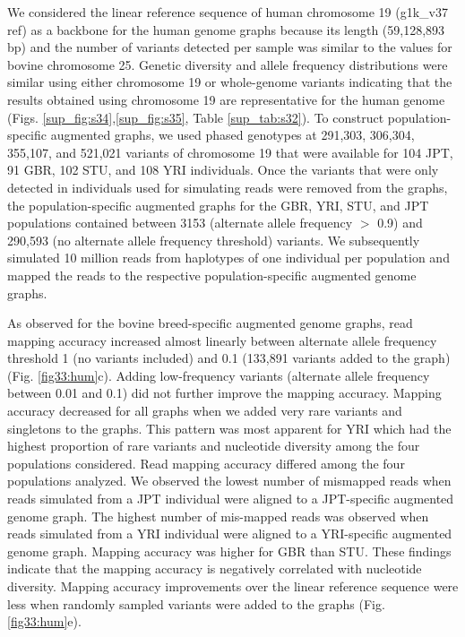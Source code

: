 \documentclass[../main.tex]{subfiles}
\begin{document}
We considered the linear reference sequence of human chromosome 19 (g1k\_v37 ref) as a backbone for the human genome graphs because its length (59,128,893 bp) and the number of variants detected per sample was similar to the values for bovine chromosome 25. Genetic diversity and allele frequency distributions were similar using either chromosome 19 or whole-genome variants indicating that the results obtained using chromosome 19 are representative for the human genome (Figs. \ref{sup_fig:s34},\ref{sup_fig:s35}, Table \ref{sup_tab:s32}). To construct population-specific augmented graphs, we used phased genotypes at 291,303, 306,304, 355,107, and 521,021 variants of chromosome 19 that were available for 104 JPT, 91 GBR, 102 STU, and 108 YRI individuals. Once the variants that were only detected in individuals used for simulating reads were removed from the graphs, the population-specific augmented graphs for the GBR, YRI, STU, and JPT populations contained between 3153 
(alternate allele frequency $>$ 0.9) and 290,593 (no alternate allele frequency threshold) variants. We subsequently simulated 10 million reads from haplotypes of one individual per population and mapped the reads to the respective population-specific augmented genome graphs.

As observed for the bovine breed-specific augmented genome graphs, read mapping accuracy increased almost linearly between alternate allele frequency threshold 1 (no variants included) and 0.1 (133,891 variants added to the graph) (Fig. \ref{fig33:hum}c). Adding low-frequency variants (alternate allele frequency between 0.01 and 0.1) did not further improve the mapping accuracy. Mapping accuracy decreased for all graphs when we added very rare variants and singletons to the graphs. This pattern was most apparent for YRI which had the highest proportion of rare variants and nucleotide diversity among the four populations considered. Read mapping accuracy differed among the four populations analyzed. We observed the lowest number of mis\-mapped reads when reads simulated from a JPT individual were aligned to a JPT-specific augmented genome graph. The highest number of mis-mapped reads was observed when reads simulated from a YRI individual were aligned to a YRI-specific augmented genome graph. Mapping accuracy was higher for GBR than STU. These findings indicate that the mapping accuracy is negatively correlated with nucleotide diversity. Mapping accuracy improvements over the linear reference sequence were less when randomly sampled variants were added to the graphs (Fig. \ref{fig33:hum}e).
\end{document}
